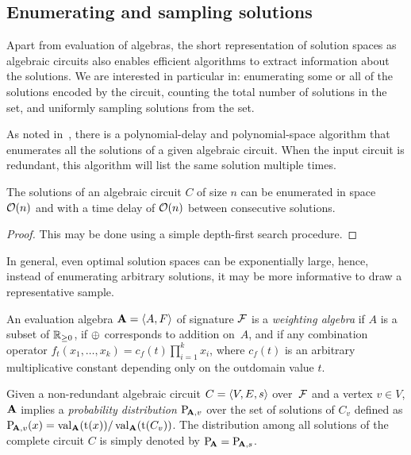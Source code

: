 \subsection{Enumerating and sampling solutions}\label{sec:adp:space-enum-sample}

Apart from evaluation of algebras, the short representation of solution spaces as algebraic circuits also enables efficient algorithms to extract information about the solutions.
We are interested in particular in: enumerating some or all of the solutions encoded by the circuit, counting the total number of solutions in the set, and uniformly sampling solutions from the set.

As noted in~\textcite{Wilf1977UnifiedSettingSequencing,Wang2021GeneralFrameworkEnumerating}, there is a polynomial-delay and polynomial-space algorithm that enumerates all the solutions of a given algebraic circuit.
When the input circuit is redundant, this algorithm will list the same solution multiple times.

\begin{lemma}\label{lem:algebraic-circuit-enum}
    The solutions of an algebraic circuit \(C\)\! of size \(n\) can be enumerated in space~\(\operatorname{\mathcal{O}}(n)\) and with a time delay of \(\operatorname{\mathcal{O}}(n)\) between consecutive solutions.
\end{lemma}
\begin{proof}
    This may be done using a simple depth-first search procedure.
\end{proof}

In general, even optimal solution spaces can be exponentially large, hence, instead of enumerating arbitrary solutions, it may be more informative to draw a representative sample.

\begin{definition}
    An evaluation algebra \(\mathbf{A} = \left\langle A, F\right\rangle\) of signature \(\mathcal{F}\)
    is a \emph{weighting algebra}
    if \(A\) is a subset of \(\mathbb{R}_{\ge 0}\),
    if \(\mathbin{\oplus}\) corresponds to addition on~\(A\),
    and if any combination operator \(f_t(x_1, \ldots, x_k) = c_f(t)\prod_{i=1}^k{x_i}\),
    where \(c_f(t)\) is an arbitrary multiplicative constant depending only on the outdomain value \(t\).

    Given a non-redundant algebraic circuit \(C = \left\langle V, E, s\right\rangle\) over~\(\mathcal{F}\)
    and a vertex \(v \in V\),
    \(\mathbf{A}\) implies a \emph{probability distribution} \(\mathrm{P}\!_{\mathbf{A},v}\)
    over the set of solutions of \(C_v\) defined as
    \(\mathrm{P}\!_{\mathbf{A},v}(x) = \operatorname{val}_{\mathbf{A}}(\operatorname{t}(x)) / \operatorname{val}_{\mathbf{A}}(\operatorname{t}(C_v))\).
    The distribution among all solutions of the complete circuit \(C\) is simply denoted by \(\mathrm{P}\!_{\mathbf{A}} = \mathrm{P}\!_{\mathbf{A},s}\).
\end{definition}

